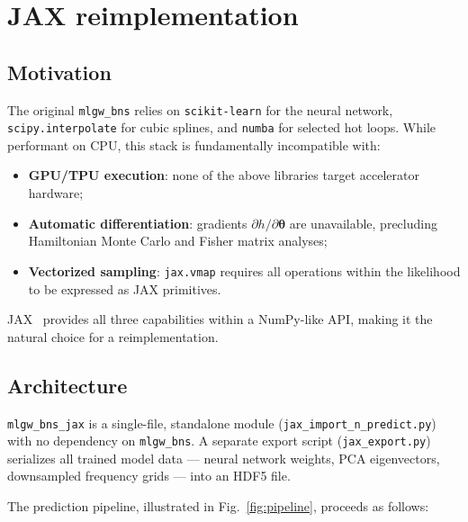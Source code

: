 \documentclass[twocolumn,superscriptaddress,nofootinbib,aps,prd]{revtex4-2}
\begin{document}
\section{JAX reimplementation}
\label{sec:jax}

\subsection{Motivation}

The original \texttt{mlgw\_bns} relies on \texttt{scikit-learn} for the
neural network, \texttt{scipy.interpolate} for cubic splines, and
\texttt{numba} for selected hot loops.  While performant on CPU, this
stack is fundamentally incompatible with:
\begin{itemize}
    \item \textbf{GPU/TPU execution}: none of the above libraries target
          accelerator hardware;
    \item \textbf{Automatic differentiation}: gradients $\partial h /
          \partial\bm{\theta}$ are unavailable, precluding Hamiltonian Monte
          Carlo and Fisher matrix analyses;
    \item \textbf{Vectorized sampling}: \texttt{jax.vmap} requires all
          operations within the likelihood to be expressed as JAX primitives.
\end{itemize}

JAX~\cite{jax2018github} provides all three capabilities within a NumPy-like
API, making it the natural choice for a reimplementation.

\subsection{Architecture}

\texttt{mlgw\_bns\_jax} is a single-file, standalone module
(\texttt{jax\_import\_n\_predict.py}) with no dependency on
\texttt{mlgw\_bns}.  A separate export script (\texttt{jax\_export.py})
serializes all trained model data --- neural network weights, PCA
eigenvectors, downsampled frequency grids --- into an HDF5 file.

The prediction pipeline, illustrated in Fig.~\ref{fig:pipeline}, proceeds as
follows:
\end{document}
